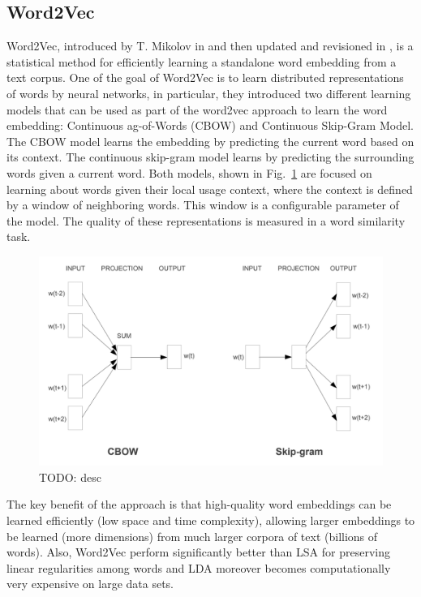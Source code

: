 \subsection{Word2Vec}

Word2Vec, introduced by T. Mikolov in  and then
updated and revisioned in , is a statistical
method for efficiently learning a standalone word embedding from a
text corpus. One of the goal of Word2Vec is to learn distributed
representations of words by neural networks, in particular, they
introduced two different learning models that can be used as part of
the word2vec approach to learn the word embedding: Continuous
ag-of-Words (CBOW) and Continuous Skip-Gram Model. The CBOW model
learns the embedding by predicting the current word based on its
context. The continuous skip-gram model learns by predicting the
surrounding words given a current word. Both models, shown in
Fig.~\ref{fig:word2vec-learning-models} are focused on learning about
words given their local usage context, where the context is defined by
a window of neighboring words. This window is a configurable parameter
of the model. The quality of these representations is measured in a
word similarity task.

\begin{figure}
  \includegraphics[width=\textwidth]{figures/word2vec-training-models.png}
  \caption[TODO]{TODO: desc}
  \label{fig:word2vec-learning-models}
\end{figure}

The key benefit of the approach is that high-quality word embeddings
can be learned efficiently (low space and time complexity), allowing
larger embeddings to be learned (more dimensions) from much larger
corpora of text (billions of words). Also, Word2Vec perform
significantly better than LSA for preserving linear regularities among
words and LDA moreover becomes computationally very expensive on
large data sets.

